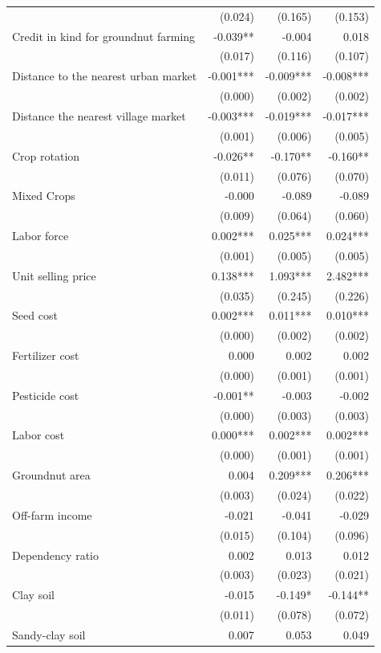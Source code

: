 \documentclass[
]{article}
\begin{document}
\begin{landscape}
\begin{longtable}[t]{lrrr}
 & (0.024) & (0.165) & (0.153)\\
Credit in kind for groundnut farming & -0.039** & -0.004 & 0.018\\
 & (0.017) & (0.116) & (0.107)\\
Distance to the nearest urban market & -0.001*** & -0.009*** & -0.008***\\
 & (0.000) & (0.002) & (0.002)\\
Distance the nearest village market & -0.003*** & -0.019*** & -0.017***\\
 & (0.001) & (0.006) & (0.005)\\
Crop rotation & -0.026** & -0.170** & -0.160**\\
 & (0.011) & (0.076) & (0.070)\\
Mixed Crops & -0.000 & -0.089 & -0.089\\
 & (0.009) & (0.064) & (0.060)\\
Labor force & 0.002*** & 0.025*** & 0.024***\\
 & (0.001) & (0.005) & (0.005)\\
Unit selling price & 0.138*** & 1.093*** & 2.482***\\
 & (0.035) & (0.245) & (0.226)\\
Seed cost & 0.002*** & 0.011*** & 0.010***\\
 & (0.000) & (0.002) & (0.002)\\
Fertilizer cost & 0.000 & 0.002 & 0.002\\
 & (0.000) & (0.001) & (0.001)\\
Pesticide cost & -0.001** & -0.003 & -0.002\\
 & (0.000) & (0.003) & (0.003)\\
Labor cost & 0.000*** & 0.002*** & 0.002***\\
 & (0.000) & (0.001) & (0.001)\\
Groundnut area & 0.004 & 0.209*** & 0.206***\\
 & (0.003) & (0.024) & (0.022)\\
Off-farm income & -0.021 & -0.041 & -0.029\\
 & (0.015) & (0.104) & (0.096)\\
Dependency ratio & 0.002 & 0.013 & 0.012\\
 & (0.003) & (0.023) & (0.021)\\
Clay soil & -0.015 & -0.149* & -0.144**\\
 & (0.011) & (0.078) & (0.072)\\
Sandy-clay soil & 0.007 & 0.053 & 0.049\\

\end{longtable}
\end{landscape}
\end{document}
